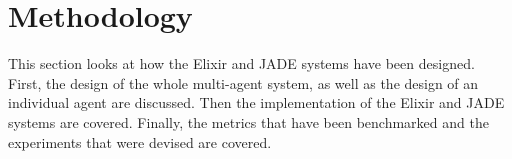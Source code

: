 \section{Methodology}

This section looks at how the Elixir and JADE systems have been designed.
First, the design of the whole multi-agent system, as well as the design of an individual agent are discussed.
Then the implementation of the Elixir and JADE systems are covered.
Finally, the metrics that have been benchmarked and the experiments that were devised are covered.












